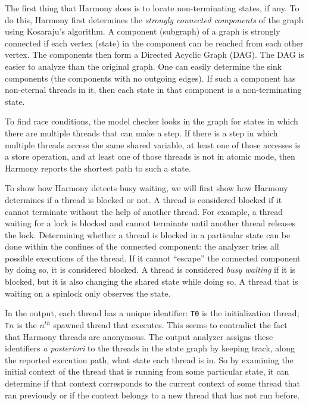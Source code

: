 \documentclass{report}
\begin{document}
The first thing that Harmony does is to locate non-terminating
states, if any.  To do this, Harmony first determines the \emph{strongly
connected components} of the graph using Kosaraju's algorithm.
A component (subgraph) of a graph is strongly connected if each
vertex (state) in the component can be reached from each other vertex.
The components then form a Directed Acyclic Graph (DAG).
The DAG is easier to analyze than the original graph.
One can easily determine the sink components
(the components with no outgoing edges).  If such a component
has non-eternal threads in it, then each state in that component
is a non-terminating state.

To find race conditions, the model checker looks in the graph for
states in which there are multiple threads that can make a step.
If there is a step in which multiple threads access the same shared
variable, at least one of those accesses is a store operation, and
at least one of those threads is not in atomic mode, then Harmony
reports the shortest path to such a state.

To show how Harmony detects busy waiting, we will first show how
Harmony determines if a thread is blocked or not.  A thread is considered
blocked if it cannot terminate without the help of another thread.
For example, a thread waiting for a lock is blocked and cannot terminate
until another thread releases the lock.  Determining whether a thread
is blocked in a particular state can be done within the confines of the
connected component: the analyzer tries all possible executions of the
thread.  If it cannot ``escape'' the connected component by doing so, it
is considered blocked.
A thread is considered \emph{busy waiting} if it is blocked, but it is
also changing the shared state while doing so.  A thread that is waiting
on a spinlock only observes the state.

In the output, each thread has a unique identifier:
\texttt{T0} is the initialization thread; \texttt{T}$n$ is the $n^{th}$
spawned thread that executes.  This seems to contradict the fact that
Harmony threads are anonymous.  The output analyzer assigns these
identifiers \emph{a posteriori} to the threads in the state graph
by keeping track, along the reported execution path, what state each
thread is in.  So by examining the initial context of the thread that
is running from some particular state, it can determine if that context
corresponds to the current context of some thread that ran previously
or if the context belongs to a new thread that has not run before.
\end{document}
